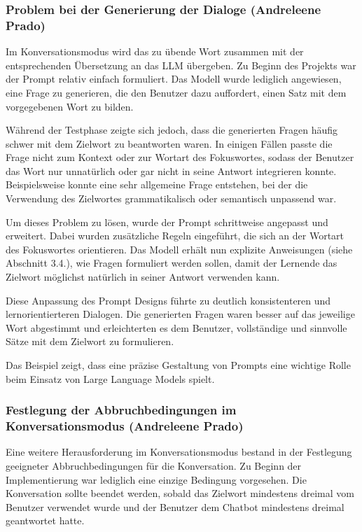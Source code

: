 \subsubsection{Problem bei der Generierung der Dialoge (Andreleene Prado)}
Im Konversationsmodus wird das zu übende Wort zusammen mit der entsprechenden Übersetzung an das LLM übergeben. 
Zu Beginn des Projekts war der Prompt relativ einfach formuliert. 
Das Modell wurde lediglich angewiesen, eine Frage zu generieren, die den Benutzer dazu auffordert, einen Satz mit dem vorgegebenen Wort zu bilden.

Während der Testphase zeigte sich jedoch, dass die generierten Fragen häufig schwer mit dem Zielwort zu beantworten waren. 
In einigen Fällen passte die Frage nicht zum Kontext oder zur Wortart des Fokuswortes, sodass der Benutzer das Wort nur unnatürlich oder gar nicht in seine Antwort integrieren konnte. 
Beispielsweise konnte eine sehr allgemeine Frage entstehen, bei der die Verwendung des Zielwortes grammatikalisch oder semantisch unpassend war.

Um dieses Problem zu lösen, wurde der Prompt schrittweise angepasst und erweitert. 
Dabei wurden zusätzliche Regeln eingeführt, die sich an der Wortart des Fokuswortes orientieren. 
Das Modell erhält nun explizite Anweisungen (siehe Abschnitt 3.4.), wie Fragen formuliert werden sollen, damit der Lernende das Zielwort möglichst natürlich in seiner Antwort verwenden kann.

Diese Anpassung des Prompt Designs führte zu deutlich konsistenteren und lernorientierteren Dialogen. 
Die generierten Fragen waren besser auf das jeweilige Wort abgestimmt und erleichterten es dem Benutzer, vollständige und sinnvolle Sätze mit dem Zielwort zu formulieren.

Das Beispiel zeigt, dass eine präzise Gestaltung von Prompts eine wichtige Rolle beim Einsatz von Large Language Models spielt.

\subsubsection{Festlegung der Abbruchbedingungen im Konversationsmodus (Andreleene Prado)}
Eine weitere Herausforderung im Konversationsmodus bestand in der Festlegung geeigneter Abbruchbedingungen für die Konversation. 
Zu Beginn der Implementierung war lediglich eine einzige Bedingung vorgesehen.
Die Konversation sollte beendet werden, sobald das Zielwort mindestens dreimal vom Benutzer verwendet wurde und der Benutzer dem Chatbot mindestens dreimal geantwortet hatte.

